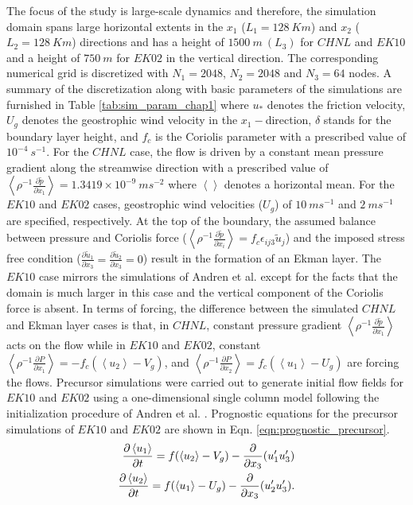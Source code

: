 The focus of the study is large-scale dynamics and therefore, the simulation domain spans large horizontal extents in the $x_1$ ($L_{1}=128\ Km$) and $x_2$ ($L_{2}=128\ Km$) directions and has a height of $1500\ m\ (L_3)$ for $CHNL$ and $EK10$ and a height of $750\ m$ for $EK02$ in the vertical direction. The corresponding numerical grid is discretized with $N_{1}= 2048$, $N_{2}=2048$ and $N_{3}=64$ nodes. A summary of the discretization along with basic parameters of the simulations are furnished in Table \ref{tab:sim_param_chap1} where  $u_*$ denotes the friction velocity, $U_g$ denotes the geostrophic wind velocity in the $x_1-$direction, $\delta$ stands for the boundary layer height, and $f_c$ is the Coriolis parameter with a prescribed value of $10^{-4}\ s^{-1}$. For the $CHNL$ case, the flow is driven by a constant mean pressure gradient along the streamwise direction with a prescribed value of $\left < \rho^{-1} \frac{\partial \tilde{p}}{\partial x_1} \right > = 1.3419\times 10^{-9}\ ms^{-2}$ where $\left <  \right >$ denotes a horizontal mean. For the $EK10$ and $EK02$ cases, geostrophic wind velocities ($U_{g}$) of $10\ ms^{-1}$ and $2\ ms^{-1}$ are specified, respectively. At the top of the boundary, the assumed balance between pressure and Coriolis force ($\left < \rho^{-1}\frac{\partial \tilde{p} }{\partial x_i} \right > = f_c\epsilon_{ij3}\tilde{u}_j$) and the imposed stress free condition ($\frac{\partial \tilde{u}_1}{\partial x_3}=\frac{\partial \tilde{u}_2}{\partial x_3}=0$) result in the formation of an Ekman layer. The $EK10$ case mirrors the simulations of Andren et al. \cite{andren_brown_qjrm_94} except for the facts that the domain is much larger in this case and the vertical component of the Coriolis force is absent. In terms of forcing, the difference between the simulated $CHNL$ and Ekman layer cases is that, in $CHNL$, constant pressure gradient $\left < \rho^{-1} \frac{\partial \tilde{p}}{\partial x_1} \right >$   acts on the flow while in $EK10$ and $EK02$, constant $\left < \rho^{-1}\frac{\partial P }{\partial x_1} \right >  = -f_c (\left < u_2\right > - V_g)$, and $\left < \rho^{-1}\frac{\partial P }{\partial x_2} \right >  = f_c (\left < u_1\right > - U_g)$ are forcing the flows. Precursor simulations were carried out to generate initial flow fields for $EK10$ and $EK02$ using a one-dimensional single column model following the initialization procedure of Andren et al. \cite{andren_brown_qjrm_94}. Prognostic equations for the precursor simulations of $EK10$ and $EK02$ are shown in Eqn. \ref{eqn:prognostic_precursor}.
\begin{align}
\frac{\partial \left < u_{1} \right >}{\partial t}=f(\left < u_{2} \right > - V_g)-\frac{\partial }{\partial x_3}(u_{1}'u_{3}') \notag \\
\frac{\partial \left < u_{2} \right > }{\partial t}=f(\left < u_{1} \right > - U_g)-\frac{\partial }{\partial x_3}(u_{2}'u_{3}').
\label{eqn:prognostic_precursor}
\end{align} 
